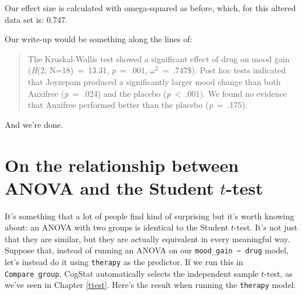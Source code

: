 \documentclass[
]{book}
\theoremstyle{definition}
\theoremstyle{definition}
\theoremstyle{definition}
\theoremstyle{definition}
\theoremstyle{remark}
\begin{document}
Our effect size is calculated with omega-squared as before, which, for this altered data set is: \(0.747\).

Our write-up would be something along the lines of:

\begin{quote}
The Kruskal-Wallis test showed a significant effect of drug on mood gain (\emph{H}(2, N=18)~=~13.31, \emph{p}~=~.001, \(\omega^2\)~=~.747\$). Post hoc tests indicated that Joyzepam produced a significantly larger mood change than both Anxifree (\emph{p}~=~.024) and the placebo (\emph{p}~\textless~.001). We found no evidence that Anxifree performed better than the placebo (\emph{p}~=~.175).
\end{quote}

And we're done.

\hypertarget{anovaandt}{%
\section{\texorpdfstring{On the relationship between ANOVA and the Student \(t\)-test}{On the relationship between ANOVA and the Student t-test}}\label{anovaandt}}

It's something that a lot of people find kind of surprising but it's worth knowing about: an ANOVA with two groups is identical to the Student \(t\)-test. It's not just that they are similar, but they are actually equivalent in every meaningful way. Suppose that, instead of running an ANOVA on our \texttt{mood\_gain\ \textasciitilde{}\ drug} model, let's instead do it using \texttt{therapy} as the predictor. If we run this in \texttt{Compare\ group}, CogStat automatically selects the independent sample \(t\)-test, as we've seen in Chapter \ref{ttest}. Here's the result when running the \texttt{therapy} model:
\end{document}
